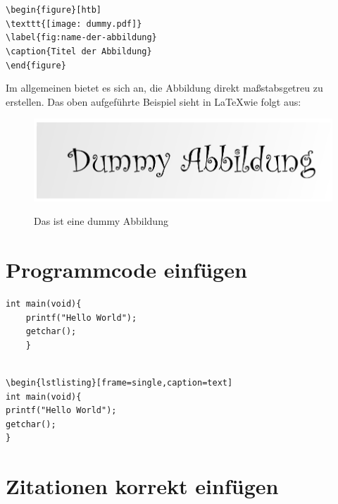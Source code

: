 \begin{syntax}
\verb|\begin{figure}[htb]|\\
\verb|\texttt{[image: dummy.pdf]}|\\
\verb|\label{fig:name-der-abbildung}|\\
\verb|\caption{Titel der Abbildung}|\\
\verb|\end{figure}|
\end{syntax}

Im allgemeinen bietet es sich an, die Abbildung direkt maßstabsgetreu zu erstellen. Das oben aufgeführte Beispiel sieht in \LaTeX wie folgt aus:

\begin{figure}[htb]
	\includegraphics{img/dummy.pdf}
	\label{fig:dummy}
	\caption{Das ist eine dummy Abbildung}
\end{figure}

\section{Programmcode einfügen}
\label{sec:programmcode}

\lstset{language=C}
\begin{lstlisting}[frame=single,caption=Ausschnitt C-Programmcode mit benutzerdefinierten Stil]
	int main(void){
	printf("Hello World");
	getchar();
	}
\end{lstlisting}

\begin{syntax}
\lstset{language=TeX}	
\begin{lstlisting}	

\begin{lstlisting}[frame=single,caption=text]
int main(void){
printf("Hello World");
getchar();
}

\end{lstlisting}

\end{syntax}

\section{Zitationen korrekt einfügen}
\label{sec:zitationen}

